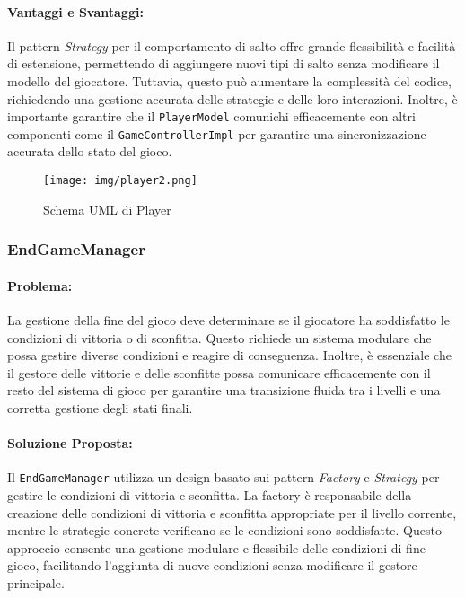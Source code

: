 \documentclass[a4paper,12pt]{report}
\begin{document}
	\paragraph{Vantaggi e Svantaggi:} 
	Il pattern \textit{Strategy} per il comportamento di salto offre grande flessibilità e facilità di estensione, permettendo di aggiungere nuovi tipi di salto senza modificare il modello del giocatore. Tuttavia, questo può aumentare la complessità del codice, richiedendo una gestione accurata delle strategie e delle loro interazioni. Inoltre, è importante garantire che il \texttt{PlayerModel} comunichi efficacemente con altri componenti come il \texttt{GameControllerImpl} per garantire una sincronizzazione accurata dello stato del gioco.
	
	\begin{figure}[H]
		\centering{}
		\texttt{[image: img/player2.png]}
		\caption{Schema UML di Player}
		\label{img:player}
	\end{figure}
	
	\subsubsection{EndGameManager}
	
	\paragraph{Problema:} La gestione della fine del gioco deve determinare se il giocatore ha soddisfatto le condizioni di vittoria o di sconfitta. Questo richiede un sistema modulare che possa gestire diverse condizioni e reagire di conseguenza. Inoltre, è essenziale che il gestore delle vittorie e delle sconfitte possa comunicare efficacemente con il resto del sistema di gioco per garantire una transizione fluida tra i livelli e una corretta gestione degli stati finali.
	
	\paragraph{Soluzione Proposta:} Il \texttt{EndGameManager} utilizza un design basato sui pattern \textit{Factory} e \textit{Strategy} per gestire le condizioni di vittoria e sconfitta. La factory è responsabile della creazione delle condizioni di vittoria e sconfitta appropriate per il livello corrente, mentre le strategie concrete verificano se le condizioni sono soddisfatte. Questo approccio consente una gestione modulare e flessibile delle condizioni di fine gioco, facilitando l'aggiunta di nuove condizioni senza modificare il gestore principale.
	
\end{document}
